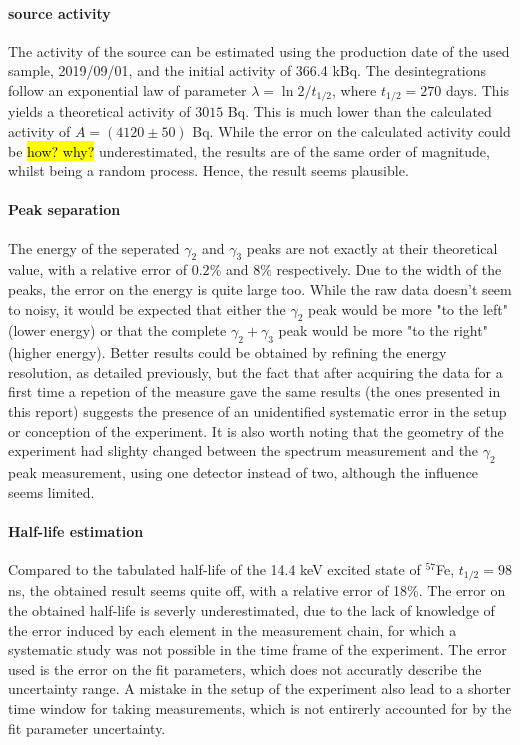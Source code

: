 \paragraph{\cobalt source activity}
The activity of the source can be estimated using the production date of the used sample, 2019/09/01, and the initial activity of 366.4 kBq. The desintegrations follow an exponential law of parameter \(\lambda = \ln 2 / t_{1/2}\), where \(t_{1/2} = 270\) days. This yields a theoretical activity of \(3015\) Bq. This is much lower than the calculated activity of \(A = (4120 \pm 50)\) Bq. While the error on the calculated activity could be \hl{how? why?} underestimated, the results are of the same order of magnitude, whilst being a random process. Hence, the result seems plausible.

\paragraph{Peak separation}
The energy of the seperated \(\gamma_2\) and \(\gamma_3\) peaks are not exactly at their theoretical value, with a relative error of \(0.2\%\) and \(8\%\) respectively. 
Due to the width of the peaks, the error on the energy is quite large too. 
While the raw data doesn't seem to noisy, it would be expected that either the \(\gamma_2\) peak would be more "to the left" (lower energy) or that the complete \(\gamma_2+\gamma_3\) peak would be more "to the right" (higher energy). 
Better results could be obtained by refining the energy resolution, as detailed previously, but the fact that after acquiring the data for a first time a repetion of the measure gave the same results (the ones presented in this report) suggests the presence of an unidentified systematic error in the setup or conception of the experiment. 
It is also worth noting that the geometry of the experiment had slighty changed between the spectrum measurement and the \(\gamma_2\) peak measurement, using one detector instead of two, although the influence seems limited.

\paragraph{Half-life estimation}
Compared to the tabulated half-life of the 14.4 keV excited state of $^{57}$Fe, \(t_{1/2} = 98\) ns, the obtained result seems quite off, with a relative error of 18\%. The error on the obtained half-life is severly underestimated, due to the lack of knowledge of the error induced by each element in the measurement chain, for which a systematic study was not possible in the time frame of the experiment. The error used is the error on the fit parameters, which does not accuratly describe the uncertainty range. A mistake in the setup of the experiment also lead to a shorter time window for taking measurements, which is not entirerly accounted for by the fit parameter uncertainty.
